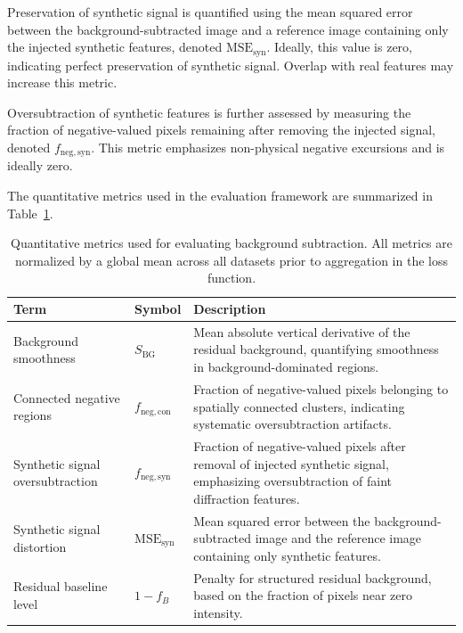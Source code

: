 \documentclass[iucr]{iucrjournals}
\begin{document}
Preservation of synthetic signal is quantified using the mean squared error between the background-subtracted image and a reference image containing only the injected synthetic features, denoted $\mathrm{MSE}_{\mathrm{syn}}$. Ideally, this value is zero, indicating perfect preservation of synthetic signal. 
Overlap with real features may increase this metric.

Oversubtraction of synthetic features is further assessed by measuring the fraction of negative-valued pixels remaining after removing the injected signal, denoted $f_{\mathrm{neg,syn}}$. This metric emphasizes non-physical negative excursions and is ideally zero.

The quantitative metrics used in the evaluation framework are summarized in Table~\ref{tab:loss_terms}.


\begin{table}[t]
\caption{Quantitative metrics used for evaluating background subtraction. 
All metrics are normalized by a global mean across all datasets prior to aggregation in the loss function.}
\label{tab:loss_terms}
\centering
\small
\setlength{\tabcolsep}{6pt}
\renewcommand{\arraystretch}{1.1}
\begin{tabular}{@{}llp{7cm}@{}}
\toprule
\textbf{Term} & \textbf{Symbol} & \textbf{Description} \\
\midrule
Background smoothness & $S_{\mathrm{BG}}$ & Mean absolute vertical derivative of the residual background, quantifying smoothness in background-dominated regions. \\
Connected negative regions & $f_{\mathrm{neg,con}}$ & Fraction of negative-valued pixels belonging to spatially connected clusters, indicating systematic oversubtraction artifacts. \\
Synthetic signal oversubtraction & $f_{\mathrm{neg,syn}}$ & Fraction of negative-valued pixels after removal of injected synthetic signal, emphasizing oversubtraction of faint diffraction features. \\
Synthetic signal distortion & $\mathrm{MSE}_{\mathrm{syn}}$ & Mean squared error between the background-subtracted image and the reference image containing only synthetic features. \\
Residual baseline level & $1 - f_{B}$ & Penalty for structured residual background, based on the fraction of pixels near zero intensity. \\
\bottomrule
\end{tabular}
\end{table}
\end{document}
